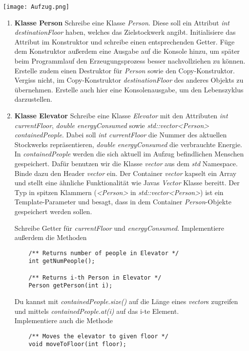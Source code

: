 \texttt{[image: Aufzug.png]}

\begin{enumerate}
\item \textbf{Klasse Person}
Schreibe eine Klasse \emph{Person}.
Diese soll ein Attribut \emph{int destinationFloor} haben, welches das Zielstockwerk angibt. 
Initialisiere das Attribut im Konstruktor und schreibe einen entsprechenden Getter.
Füge dem Konstruktor außerdem eine Ausgabe auf die Konsole hinzu, um später beim Programmlauf den Erzeugungsprozess besser nachvollziehen zu können.
Erstelle zudem einen Destruktor für \emph{Person} sowie den Copy-Konstruktor.
Vergiss nicht, im Copy-Konstruktor \emph{destinationFloor} des anderes Objekts zu übernehmen.
Erstelle auch hier eine Konsolenausgabe, um den Lebenszyklus darzustellen.

\item \textbf{Klasse Elevator}
Schreibe eine Klasse \emph{Elevator} mit den Attributen \emph{int currentFloor}, \emph{double energyConsumed} sowie \emph{std::vector<Person> containedPeople}.
Dabei soll \emph{int currentFloor} die Nummer des aktuellen Stockwerks repräsentieren, \emph{double energyConsumed} die verbrauchte Energie. 
In \emph{containedPeople} werden die sich aktuell im Aufzug befindlichen Menschen gespeichert.
Dafür benutzen wir die Klasse \emph{vector} aus dem \emph{std} Namespace.
Binde dazu den Header \emph{vector} ein.
Der Container \emph{vector} kapselt ein Array und stellt eine ähnliche Funktionalität wie Javas \emph{Vector} Klasse bereitt.
Der Typ in spitzen Klammern (\emph{<Person>} in \emph{std::vector<Person>}) ist ein Template-Parameter und besagt, dass in dem Container \emph{Person}-Objekte gespeichert werden sollen.

Schreibe Getter für \emph{currentFloor} und \emph{energyConsumed}.
Implementiere außerdem die Methoden
\begin{lstlisting}
	/** Returns number of people in Elevator */
	int getNumPeople();
	
	/** Returns i-th Person in Elevator */
	Person getPerson(int i);
\end{lstlisting} 

Du kannst mit \emph{containedPeople.size()} auf die Länge eines \emph{vector}s zugreifen und mittels \emph{containedPeople.at(i)} auf das i-te Element. \\

Implementiere auch die Methode
\begin{lstlisting}
	/** Moves the elevator to given floor */
	void moveToFloor(int floor);
\end{lstlisting}


\end{enumerate}
